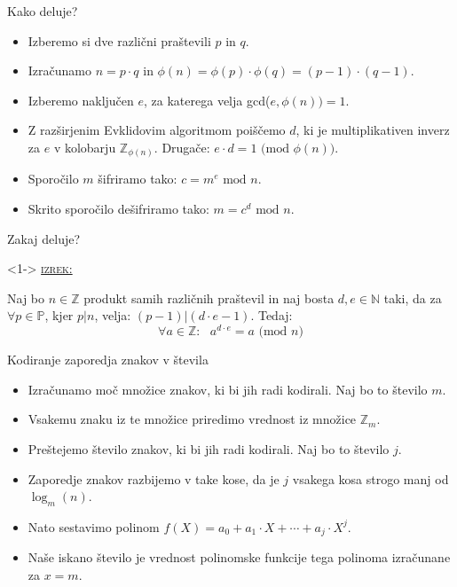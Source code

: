 \documentclass[a4paper, 12pt]{beamer} %
\newenvironment{matematika}[1]{
\textcolor{bostonuniversityred}{\underline{\textsc{#1:}}}
}{
}
\begin{document}
\begin{frame}{Kako deluje?}
\begin{itemize}[label=]
\item<1-> Izberemo si dve različni praštevili $p$ in $q$.
\item<2-> Izračunamo $n = p \cdot q$ in $\phi(n) = \phi(p) \cdot \phi(q) = (p-1) \cdot (q-1).$
\item<3-> Izberemo naključen $e$, za katerega velja gcd($e, \phi(n)) = 1$.
\item<4-> Z razširjenim Evklidovim algoritmom poiščemo $d$, ki je multiplikativen inverz za $e$ v kolobarju $\mathbb{Z}_{\phi(n)}$. Drugače: $e \cdot d = 1 \text{ (mod } \phi(n))$.
\item<5-> Sporočilo $m$ šifriramo tako: $c = m^e \text{ mod } n$.
\item<6-> Skrito sporočilo dešifriramo tako: $m = c^d \text{ mod } n$.
\end{itemize}
\end{frame}

\begin{frame}{Zakaj deluje?}
\begin{block}<1->{}
\begin{matematika}{izrek}
Naj bo $n \in \mathbb{Z}$ produkt samih različnih praštevil in naj bosta $d, e\in \mathbb{N}$ taki, da za $\forall p \in \mathbb{P}$, kjer $p | n$, velja: $(p-1) | (d \cdot e - 1)$. Tedaj:
\newline
\[
\forall a \in \mathbb{Z}: \text{ } a^{d \cdot e} = a \text{ (mod }n)
\]
\end{matematika}
\end{block}
\end{frame}

\begin{frame}{Kodiranje zaporedja znakov v števila}
\begin{itemize}[label=]
\item<1-> Izračunamo moč množice znakov, ki bi jih radi kodirali. Naj bo to število $m$.
\item<2-> Vsakemu znaku iz te množice priredimo vrednost iz množice $\mathbb{Z}_m$.
\item<3-> Preštejemo število znakov, ki bi jih radi kodirali. Naj bo to število $j$.
\item<4-> Zaporedje znakov razbijemo v take kose, da je $j$ vsakega kosa strogo manj od $\log_{m}(n)$.
\item<4-> Nato sestavimo polinom $f(X) = a_0 + a_1 \cdot X + \cdots + a_j \cdot X^j$. 
\item<5-> Naše iskano število je vrednost polinomske funkcije tega polinoma izračunane za $x = m$.
\end{itemize}
\end{frame}
\end{document}
